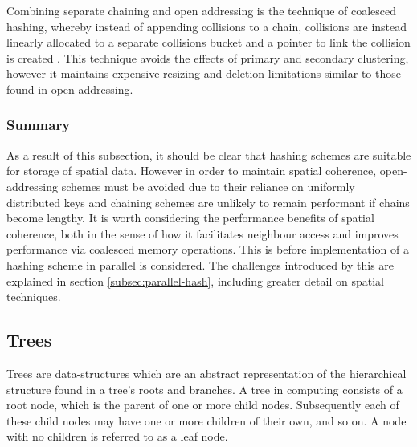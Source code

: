       Combining separate chaining and open addressing is the technique of coalesced hashing, whereby instead of appending collisions to a chain, collisions are instead linearly allocated to a separate collisions bucket and a pointer to link the collision is created \cite{Vit82}. This technique avoids the effects of primary and secondary clustering, however it maintains expensive resizing and deletion limitations similar to those found in open addressing.
    \subsubsection{Summary}
      As a result of this subsection, it should be clear that hashing schemes are suitable for storage of spatial data. However in order to maintain spatial coherence, open-addressing schemes must be avoided due to their reliance on uniformly distributed keys and chaining schemes are unlikely to remain performant if chains become lengthy. It is worth considering the performance benefits of spatial coherence, both in the sense of how it facilitates neighbour access and improves performance via coalesced memory operations.
      This is before implementation of a hashing scheme in parallel is considered. The challenges introduced by this are explained in section \ref{subsec:parallel-hash}, including greater detail on spatial techniques.
    
  \subsection{Trees}
    Trees are data-structures which are an abstract representation of the hierarchical structure found in a tree's roots and branches. A tree in computing consists of a root node, which is the parent of one or more child nodes. Subsequently each of these child nodes may have one or more children of their own, and so on. A node with no children is referred to as a leaf node.

